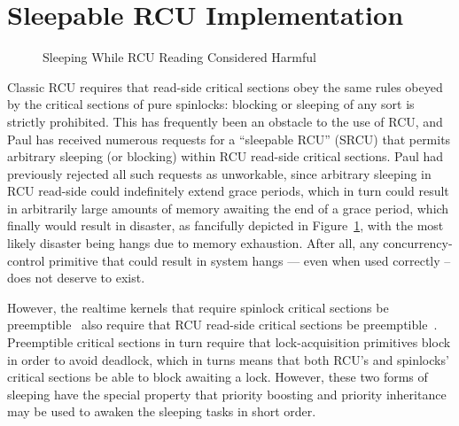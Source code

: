
\section{Sleepable RCU Implementation}
\label{app:rcuimpl:Sleepable RCU Implementation}

\begin{figure}[tb]
\begin{center}
\end{center}
\caption{Sleeping While RCU Reading Considered Harmful}
\label{fig:app:rcuimpl:srcu:Sleeping While RCU Reading Considered Harmful}
\end{figure}

Classic RCU requires that read-side critical sections
obey the same rules
obeyed by the critical sections of pure spinlocks: blocking or sleeping
of any sort is strictly prohibited.
This has frequently been an obstacle to the use of RCU, and
Paul has received numerous requests for a ``sleepable RCU'' (SRCU) that
permits arbitrary sleeping (or blocking) within RCU read-side critical
sections.
Paul had previously rejected all such requests as unworkable, since arbitrary
sleeping in RCU read-side could indefinitely extend grace periods, which
in turn could result in arbitrarily large amounts of memory awaiting the
end of a grace period, which finally would result in disaster,
as fancifully depicted in
Figure~\ref{fig:app:rcuimpl:srcu:Sleeping While RCU Reading Considered Harmful},
with the most likely disaster being hangs due to memory exhaustion.
After all, any concurrency-control primitive that could result in
system hangs --- even when used correctly -- does not deserve to exist.

However, the realtime kernels that require spinlock critical sections
be preemptible~\cite{IngoMolnar05a} also require that RCU read-side critical
sections be preemptible~\cite{PaulMcKenney05b}.
Preemptible critical sections in turn require that lock-acquisition
primitives block in order to avoid deadlock,
which in turns means that both RCU's and spinlocks'
critical sections be able to block awaiting a lock.
However, these two forms of sleeping have the special property that
priority boosting and priority inheritance may be used to awaken
the sleeping tasks in short order.

